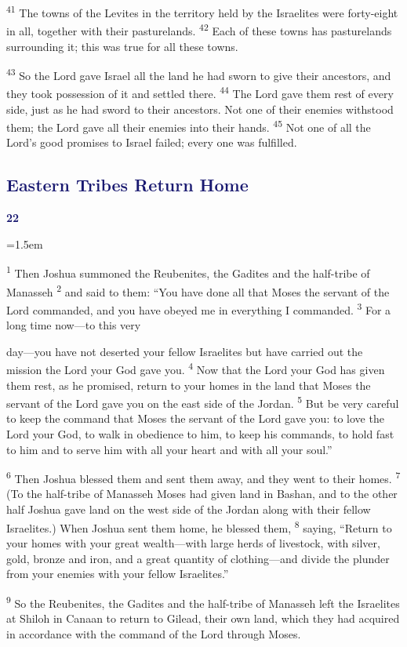 \documentclass[12pt,twoside]{article}
\newcommand{\vs}[1]{\textsuperscript{#1}}
\newcommand{\chapterWithBigIndent}[2]{%
  \noindent
  \begin{minipage}[t]{1cm}
    \vspace{-0.4\baselineskip}
    {\textcolor{MidnightBlue}{\fontsize{40pt}{48pt}\selectfont \textbf{#1}}}
  \end{minipage}%
  \hspace{0.9cm}%
  \begin{minipage}[t]{\dimexpr\linewidth - 1.5cm - 0.3cm\relax}
    \hangindent=1.5em
    \hangafter=3
    #2
    \vspace{0.05cm}
  \end{minipage}
}
\begin{document}
\vs{41} The towns of the Levites in the territory held by the Israelites were forty-eight in all, together with their pasturelands.
\vs{42} Each of these towns has pasturelands surrounding it; this was true for all these towns.\vspace{0.4cm}

\vs{43} So the Lord gave Israel all the land he had sworn to give their ancestors, and they took possession of it and settled there.
\vs{44} The Lord gave them rest of every side, just as he had sword to their ancestors. Not one of their enemies withstood them; the Lord gave all their enemies into their hands.
\vs{45} Not one of all the Lord's good promises to Israel failed; every one was fulfilled.

\subsection*{\textcolor{MidnightBlue}{\textbf{Eastern Tribes Return Home}}}

\chapterWithBigIndent{22}{
  \vs{1} Then Joshua summoned the Reubenites, the Gadites and the half-tribe of Manasseh
  \vs{2} and said to them: ``You have done all that Moses the servant of the Lord commanded, and you have obeyed me in everything I commanded.
  \vs{3} For a long time now---to this very\vspace{-0.4cm}
}
day---you have not deserted your fellow Israelites but have carried out the mission the Lord your God gave you.
\vs{4} Now that the Lord your God has given them rest, as he promised, return to your homes in the land that Moses the servant of the Lord gave you on the east side of the Jordan.
\vs{5} But be very careful to keep the command that Moses the servant of the Lord gave you: to love the Lord your God, to walk in obedience to him, to keep his commands, to hold fast to him and to serve him with all your heart and with all your soul.''

\vs{6} Then Joshua blessed them and sent them away, and they went to their homes.
\vs{7} (To the half-tribe of Manasseh Moses had given land in Bashan, and to the other half Joshua gave land on the west side of the Jordan along with their fellow Israelites.) When Joshua sent them home, he blessed them,
\vs{8} saying, ``Return to your homes with your great wealth---with large herds of livestock, with silver, gold, bronze and iron, and a great quantity of clothing---and divide the plunder from your enemies with your fellow Israelites.''

\vs{9} So the Reubenites, the Gadites and the half-tribe of Manasseh left the Israelites at Shiloh in Canaan to return to Gilead, their own land, which they had acquired in accordance with the command of the Lord through Moses.
\end{document}
